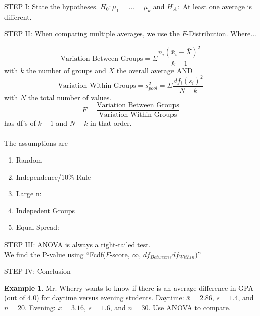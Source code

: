 \documentclass[12pt]{amsart}
\theoremstyle{definition}
\newtheorem{ex}{Example}
\begin{document}
\begin{framed}
STEP I: State the hypotheses. $H_0:\mu_1=...=\mu_k$ and $H_A:$ At least one average is different.

STEP II: When comparing multiple averages, we use the $F$-Distribution. Where...

$$\text{Variation Between Groups}=\Sigma \frac{n_i(\bar{x}_i-\bar{X})^2}{k-1}$$ with $k$ the number of groups and $\bar{X}$ the overall average AND
$$\text{Variation Within Groups}=s_{pool}^2=\Sigma \frac{df_i(s_i)^2}{N-k}$$ with $N$ the total number of values.
$$F=\frac{\text{Variation Between Groups}}{\text{Variation Within Groups}}$$ has df's of $k-1$ and $N-k$ in that order.\\
~\\
The assumptions are
\begin{enumerate}
 \item Random
 \item Independence/$10\%$ Rule
 \item Large n:
 \item Indepedent Groups
 \item Equal Spread:
 
 \vspace{0.5in}
\end{enumerate}

STEP III: ANOVA is always a right-tailed test.\\ We find the P-value using ``Fcdf($F$-score, $\infty$, $df_{Between}$,$df_{Within}$)''

STEP IV: Conclusion

\end{framed}

\begin{ex} Mr. Wherry wants to know if there is an average difference in GPA (out of 4.0) for daytime versus evening students. Daytime: $\bar{x}=2.86$, $s=1.4$, and $n=20$. Evening: $\bar{x}=3.16$, $s=1.6$, and $n=30$. Use ANOVA to compare.
 
\end{ex}

\vfill
\end{document}
